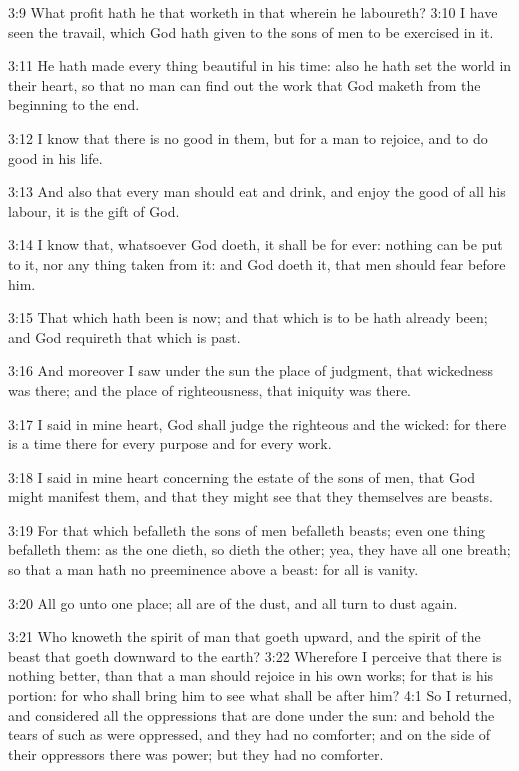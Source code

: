 3:9 What profit hath he that worketh in that wherein he laboureth?
3:10 I have seen the travail, which God hath given to the sons of men
to be exercised in it.

3:11 He hath made every thing beautiful in his time: also he hath set
the world in their heart, so that no man can find out the work that
God maketh from the beginning to the end.

3:12 I know that there is no good in them, but for a man to rejoice,
and to do good in his life.

3:13 And also that every man should eat and drink, and enjoy the good
of all his labour, it is the gift of God.

3:14 I know that, whatsoever God doeth, it shall be for ever: nothing
can be put to it, nor any thing taken from it: and God doeth it, that
men should fear before him.

3:15 That which hath been is now; and that which is to be hath already
been; and God requireth that which is past.

3:16 And moreover I saw under the sun the place of judgment, that
wickedness was there; and the place of righteousness, that iniquity
was there.

3:17 I said in mine heart, God shall judge the righteous and the
wicked: for there is a time there for every purpose and for every
work.

3:18 I said in mine heart concerning the estate of the sons of men,
that God might manifest them, and that they might see that they
themselves are beasts.

3:19 For that which befalleth the sons of men befalleth beasts; even
one thing befalleth them: as the one dieth, so dieth the other; yea,
they have all one breath; so that a man hath no preeminence above a
beast: for all is vanity.

3:20 All go unto one place; all are of the dust, and all turn to dust
again.

3:21 Who knoweth the spirit of man that goeth upward, and the spirit
of the beast that goeth downward to the earth?  3:22 Wherefore I
perceive that there is nothing better, than that a man should rejoice
in his own works; for that is his portion: for who shall bring him to
see what shall be after him?  4:1 So I returned, and considered all
the oppressions that are done under the sun: and behold the tears of
such as were oppressed, and they had no comforter; and on the side of
their oppressors there was power; but they had no comforter.

